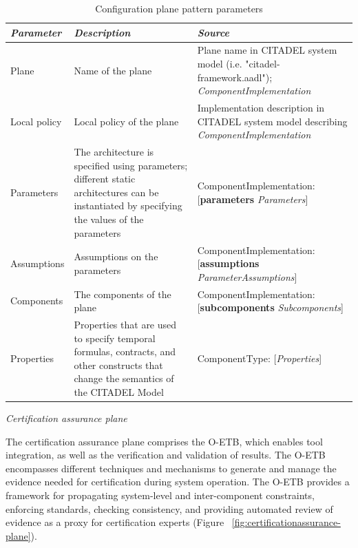 \documentclass[12pt,twoside,a4paper]{article}
\begin{document}
\begin{table}[htbp]
    \centering
    \caption{Configuration plane pattern parameters}
    \begin{tabularx}{\textwidth}{| X | X | X |}
        \hline
        \textit{\textbf{Parameter}}     & \textit{\textbf{Description}}    & \textit{\textbf{Source}}     \\ \hline
        Plane        & Name of the plane      & Plane name in CITADEL system model (i.e. "citadel-framework.aadl"); \textit{ComponentImplementation}         \\ \hline
        Local policy        & Local policy of the plane      & Implementation description in CITADEL system model describing \textit{ComponentImplementation}        \\ \hline
        Parameters       & The architecture is specified using parameters; different static architectures can be instantiated by specifying the values of the parameters      & ComponentImplementation: [\textbf{parameters} \textit{Parameters}]        \\ \hline
        Assumptions       & Assumptions on the parameters & ComponentImplementation: [\textbf{assumptions} \textit{ParameterAssumptions}]        \\ \hline
        Components       & The components of the plane & ComponentImplementation: [\textbf{subcomponents} \textit{Subcomponents}]         \\ \hline
        Properties       & Properties that are used to specify temporal formulas, contracts, and other constructs that change the semantics of the CITADEL Model & ComponentType: [\textit{Properties}]        \\ \hline
    \end{tabularx}
    \label{tab:config_plane_params}
\end{table}

\clearpage
\emph{Certification assurance plane}

The certification assurance plane comprises the O-ETB, which enables tool integration, as well as the verification and validation of results. The O-ETB encompasses different techniques and mechanisms to generate and manage the evidence needed for certification during system operation. The O-ETB provides a framework for propagating system-level and inter-component constraints, enforcing standards, checking consistency, and providing automated review of evidence as a proxy for certification experts (Figure ~\ref{fig:certificationassurance-plane}). 
\end{document}
